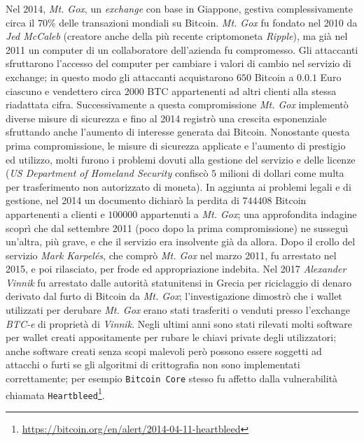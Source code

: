 Nel 2014, \textit{Mt. Gox}, un \textit{exchange} con base in Giappone, gestiva complessivamente circa il $70\%$ delle transazioni mondiali su Bitcoin. \textit{Mt. Gox} fu fondato nel 2010 da \textit{Jed McCaleb} (creatore anche della più recente criptomoneta \textit{Ripple}), ma già nel 2011 un computer di un collaboratore dell'azienda fu compromesso. Gli attaccanti sfruttarono l'accesso del computer per cambiare i valori di cambio nel servizio di exchange; in questo modo gli attaccanti acquistarono $650$ Bitcoin a $0.0.1$ Euro ciascuno e vendettero circa $2000$ BTC appartenenti ad altri clienti alla stessa riadattata cifra.\newline
Successivamente a questa compromissione \textit{Mt. Gox} implementò diverse misure di sicurezza e fino al 2014 registrò una crescita esponenziale sfruttando anche l'aumento di interesse generata dai Bitcoin. Nonostante questa prima compromissione, le misure di sicurezza applicate e l'aumento di prestigio ed utilizzo, molti furono i problemi dovuti alla gestione del servizio e delle licenze (\textit{US Department of Homeland Security} confiscò $5$ milioni di dollari come multa per trasferimento non autorizzato di moneta). In aggiunta ai problemi legali e di gestione, nel 2014 un documento dichiarò la perdita di $744408$ Bitcoin appartenenti a clienti e $100000$ appartenuti a \textit{Mt. Gox}; una approfondita indagine scoprì che dal settembre 2011 (poco dopo la prima compromissione) ne susseguì un'altra, più grave, e che il servizio era insolvente già da allora. Dopo il crollo del servizio \textit{Mark Karpelés}, che comprò \textit{Mt. Gox} nel marzo 2011, fu arrestato nel 2015, e poi rilasciato, per frode ed appropriazione indebita. Nel 2017 \textit{Alexander Vinnik} fu arrestato dalle autorità statunitensi in Grecia per riciclaggio di denaro derivato dal furto di Bitcoin da \textit{Mt. Gox}; l'investigazione dimostrò che i wallet utilizzati per derubare \textit{Mt. Gox} erano stati trasferiti o venduti presso l'exchange \textit{BTC-e} di proprietà di \textit{Vinnik}.\newline
Negli ultimi anni sono stati rilevati molti software per wallet creati appositamente per rubare le chiavi private degli utilizzatori; anche software creati senza scopi malevoli però possono essere soggetti ad attacchi o furti se gli algoritmi di crittografia non sono implementati correttamente; per esempio \texttt{Bitcoin Core} stesso fu affetto dalla vulnerabilità chiamata \texttt{Heartbleed}\footnote{\url{https://bitcoin.org/en/alert/2014-04-11-heartbleed}}.\newline\newline
